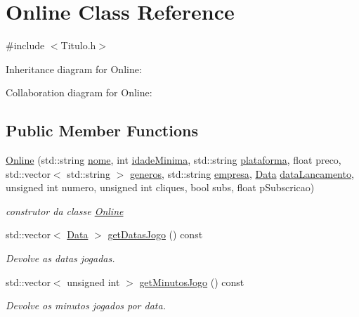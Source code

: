 \hypertarget{class_online}{}\section{Online Class Reference}
\label{class_online}


{\ttfamily \#include $<$Titulo.\+h$>$}



Inheritance diagram for Online\+:


Collaboration diagram for Online\+:
\subsection*{Public Member Functions}
\begin{DoxyCompactItemize}
\item 
\mbox{\hyperlink{class_online_ae6a934ef34ed86ab205190f2b632366a}{Online}} (std\+::string \mbox{\hyperlink{class_titulo_a8abdf1fc6d4fc14be20bbec247664d83}{nome}}, int \mbox{\hyperlink{class_titulo_a28891078f53fc3317de60ae739514955}{idade\+Minima}}, std\+::string \mbox{\hyperlink{class_titulo_a67761eb7f006453ab0869e4b7c0a9c0b}{plataforma}}, float preco, std\+::vector$<$ std\+::string $>$ \mbox{\hyperlink{class_titulo_a3209265c8534416978ee9891b96c14b2}{generos}}, std\+::string \mbox{\hyperlink{class_titulo_a91510c440dc8583d60d88ea02f4eb1b6}{empresa}}, \mbox{\hyperlink{class_data}{Data}} \mbox{\hyperlink{class_titulo_ae540ddf2c607eb0e4de29eb8c0cca7f0}{data\+Lancamento}}, unsigned int numero, unsigned int cliques, bool subs, float p\+Subscricao)
\begin{DoxyCompactList}\small\item\em construtor da classe \mbox{\hyperlink{class_online}{Online}} \end{DoxyCompactList}\item 
std\+::vector$<$ \mbox{\hyperlink{class_data}{Data}} $>$ \mbox{\hyperlink{class_online_aa6f51a948cb5ffd2c7cbac1f1cd6023f}{get\+Datas\+Jogo}} () const
\begin{DoxyCompactList}\small\item\em Devolve as datas jogadas. \end{DoxyCompactList}\item 
std\+::vector$<$ unsigned int $>$ \mbox{\hyperlink{class_online_a4ab18dfdaa0af23cda8f5268a9968887}{get\+Minutos\+Jogo}} () const
\begin{DoxyCompactList}\small\item\em Devolve os minutos jogados por data. \end{DoxyCompactList}\item 

\end{DoxyCompactItemize}
